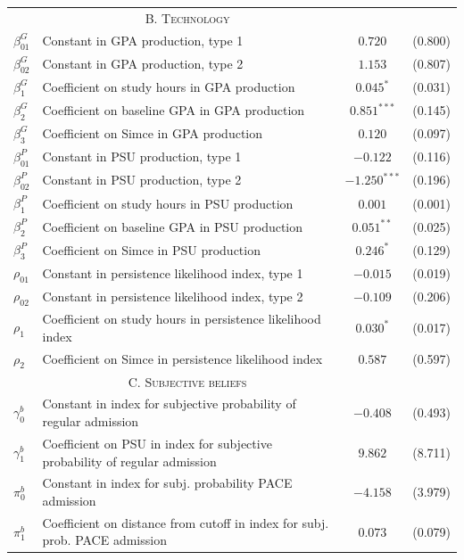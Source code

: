 \begin{table}[H]
\begin{tabular}{l*{1}{lcc}}
 & \multicolumn{1}{c}{\textsc{B. Technology}} & &\\
$\beta^{G}_{01}$ & Constant in GPA production, type 1  & $0.720$ & (0.800) \\
$\beta^{G}_{02}$ & Constant in GPA production, type 2   & $1.153$ & (0.807) \\
$\beta^{G}_{1}$ & Coefficient on study hours in GPA production & $0.045^{*}$ & (0.031) \\
$\beta^{G}_{2}$ & Coefficient on baseline GPA in GPA production & $0.851^{***}$ & (0.145) \\
$\beta^{G}_{3}$ & Coefficient on Simce in GPA production & $0.120$ & (0.097) \\
$\beta^{P}_{01}$ & Constant in PSU production, type 1   & $-0.122$ & (0.116) \\
$\beta^{P}_{02}$ & Constant in PSU production, type 2   & $-1.250^{***}$ & (0.196) \\
$\beta^{P}_{1}$ & Coefficient on study hours in PSU production & $0.001$ & (0.001) \\
$\beta^{P}_{2}$ & Coefficient on baseline GPA in PSU production & $0.051^{**}$ & (0.025) \\
$\beta^{P}_{3}$ & Coefficient on Simce in PSU production & $0.246^{*}$ & (0.129) \\
$\rho_{01}$ & Constant in persistence likelihood index, type 1   & $-0.015$ & (0.019) \\
$\rho_{02}$ & Constant in persistence likelihood index, type 2   & $-0.109$ & (0.206) \\
$\rho_{1}$ & Coefficient on study hours in persistence likelihood index & $0.030^{*}$ & (0.017) \\
$\rho_{2}$  & Coefficient on Simce in persistence likelihood index & $0.587$ & (0.597) \\


 & \multicolumn{1}{c}{\textsc{C. Subjective beliefs}} & &\\
$\gamma^{b}_{0}$ & Constant in index for subjective probability of regular admission & $-0.408$ & (0.493) \\
$\gamma^{b}_{1}$ & Coefficient on PSU in index for subjective probability of regular admission & $9.862$ & (8.711) \\

$\pi^{b}_{0}$ & Constant in index for subj. probability PACE admission & $-4.158$ & (3.979) \\
$\pi^{b}_{1}$ & Coefficient on distance from cutoff in index for subj. prob. PACE admission & $0.073$ & (0.079) \\


\end{tabular}
\end{table}
